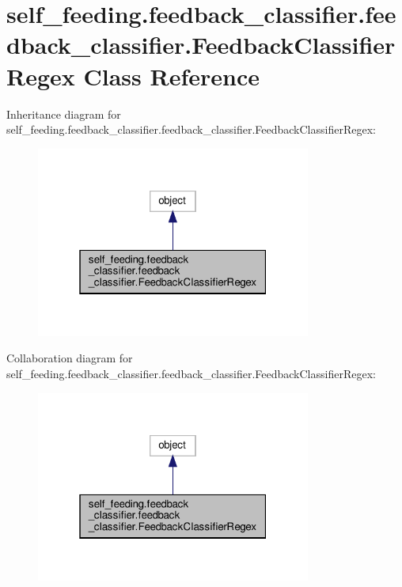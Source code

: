 \hypertarget{classself__feeding_1_1feedback__classifier_1_1feedback__classifier_1_1FeedbackClassifierRegex}{}\section{self\+\_\+feeding.\+feedback\+\_\+classifier.\+feedback\+\_\+classifier.\+Feedback\+Classifier\+Regex Class Reference}
\label{classself__feeding_1_1feedback__classifier_1_1feedback__classifier_1_1FeedbackClassifierRegex}


Inheritance diagram for self\+\_\+feeding.\+feedback\+\_\+classifier.\+feedback\+\_\+classifier.\+Feedback\+Classifier\+Regex\+:
\nopagebreak
\begin{figure}[H]
\begin{center}
\leavevmode
\includegraphics[width=256pt]{classself__feeding_1_1feedback__classifier_1_1feedback__classifier_1_1FeedbackClassifierRegex__inherit__graph}
\end{center}
\end{figure}


Collaboration diagram for self\+\_\+feeding.\+feedback\+\_\+classifier.\+feedback\+\_\+classifier.\+Feedback\+Classifier\+Regex\+:
\nopagebreak
\begin{figure}[H]
\begin{center}
\leavevmode
\includegraphics[width=256pt]{classself__feeding_1_1feedback__classifier_1_1feedback__classifier_1_1FeedbackClassifierRegex__coll__graph}
\end{center}
\end{figure}
